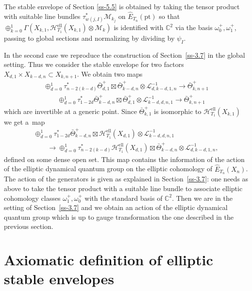 \documentclass[10pt,a4paper]{amsart}
\numberwithin{equation}{section}
\begin{document}
The stable envelope of Section \ref{ss-5.5} is obtained by taking the tensor product with suitable line bundles $\tau^*_{w(j,I)}\mathcal M_{k_j}$ on $\hat E_{T_n}(\mathrm{pt})$ so that $\oplus_{k=0}^1\Gamma(X_{k,1},\mathcal
H^{\mathrm{ell}}_{T_1}(X_{k,1})\otimes \mathcal M_k)$ is identified with $\mathbb C^2$ via the basis $\omega_0^+,\omega_1^+$, passing to global sections and normalizing by dividing by $\psi_I$.

In the second case we reproduce the construction of Section~\ref{ss-3.7} in the global setting. Thus we consider the stable envelope for two factors $X_{d,1}\times X_{k-d,n}\subset X_{k,n+1}$.
We obtain two maps
\begin{gather*}
 \oplus_{d=0}^1\tau^*_{n-2(k-d)} \bar\Theta^+_{d,1}\boxtimes \bar\Theta^+_{k-d,n}\otimes \mathcal L_{d,k-d,1,n}^{-1} \to \bar\Theta^+_{k,n+1} \\
 \qquad{} \oplus_{d=0}^1\tau^*_{1-2d} \bar\Theta^+_{k-d,n} \boxtimes \bar\Theta^+_{d,1}\otimes \mathcal L_{k-d,d,n,1}^{-1} \to \bar\Theta^+_{k,n+1}
\end{gather*}
which are invertible at a generic point. Since $\bar\Theta^+_{k,1}$ is isomorphic to $\mathcal H^{\mathrm{ell}}_{T_1}(X_{k,1})$ we get a~map
\begin{gather*}
 \oplus_{d=0}^1\tau^*_{1-2d} \bar\Theta^+_{k-d,n} \boxtimes\mathcal H^{\mathrm{ell}}_{T_1}(X_{d,1}) \otimes \mathcal L_{k-d,d,n,1}^{-1}\\
\qquad{} \to \oplus_{d=0}^1\tau^*_{n-2(k-d)} \mathcal H^{\mathrm{ell}}_{T_1}(X_{d,1})\boxtimes \bar\Theta^+_{k-d,n}\otimes \mathcal L_{d,k-d,1,n}^{-1},
\end{gather*}
defined on some dense open set. This map contains the information of the action of the elliptic dynamical quantum group on the elliptic cohomology of $\hat E_{T_n}(X_{n})$. The action of the generators is given as explained in Section~\ref{ss-3.7}: one needs as above to take the tensor product with a suitable line bundle to associate elliptic cohomology classes $\omega^+_1,\omega^+_0$ with the standard basis of $\mathbb C^2$. Then we are in the setting of Section~\ref{ss-3.7} and we obtain an action of the elliptic dynamical quantum group which is up to gauge transformation the one described in the previous section.

\appendix
\section{Axiomatic definition of elliptic stable envelopes}\label{sec:appendix}
\end{document}
